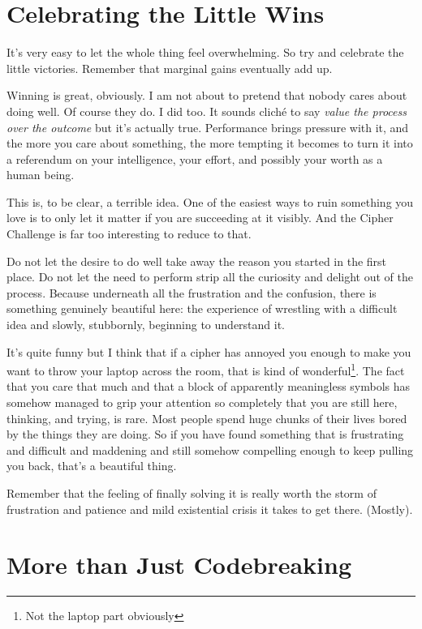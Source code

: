 \section{Celebrating the Little Wins}

It's very easy to let the whole thing feel overwhelming. So try and celebrate the little victories. Remember that marginal gains eventually add up. 

Winning is great, obviously. I am not about to pretend that nobody cares about doing well. Of course they do. I did too. It sounds cliché to say \textit{value the process over the outcome} but it's actually true. Performance brings pressure with it, and the more you care about something, the more tempting it becomes to turn it into a referendum on your intelligence, your effort, and possibly your worth as a human being.

This is, to be clear, a terrible idea. One of the easiest ways to ruin something you love is to only let it matter if you are succeeding at it visibly. And the Cipher Challenge is far too interesting to reduce to that.

Do not let the desire to do well take away the reason you started in the first place. Do not let the need to perform strip all the curiosity and delight out of the process. Because underneath all the frustration and the confusion, there is something genuinely beautiful here: the experience of wrestling with a difficult idea and slowly, stubbornly, beginning to understand it.

It’s quite funny but I think that if a cipher has annoyed you enough to make you want to throw your laptop across the room, that is kind of wonderful\footnote{Not the laptop part obviously}. The fact that you care that much and that a block of apparently meaningless symbols has somehow managed to grip your attention so completely that you are still here, thinking, and trying, is rare. Most people spend huge chunks of their lives bored by the things they are doing. So if you have found something that is frustrating and difficult and maddening and still somehow compelling enough to keep pulling you back, that’s a beautiful thing.

Remember that the feeling of finally solving it is really worth the storm of frustration and patience and mild existential crisis it takes to get there. (Mostly). 

\section{More than Just Codebreaking}

